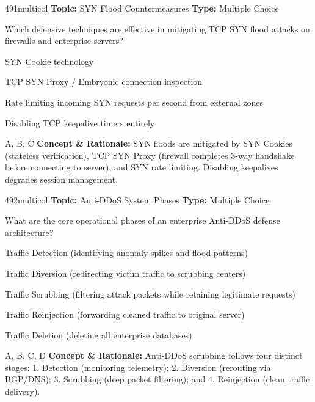 \begin{qcard}{491}{multicol}
\textcolor{darkslate!75}{\small\textbf{Topic:} SYN Flood Countermeasures \hfill \textbf{Type:} Multiple Choice}\vspace{0.4em}\par
Which defensive techniques are effective in mitigating TCP SYN flood attacks on firewalls and enterprise servers?
\begin{qoptions}
\item SYN Cookie technology
\item TCP SYN Proxy / Embryonic connection inspection
\item Rate limiting incoming SYN requests per second from external zones
\item Disabling TCP keepalive timers entirely
\end{qoptions}
\end{qcard}
\nopagebreak
\begin{explainbox}{A, B, C}
\textbf{Concept \& Rationale:} SYN floods are mitigated by SYN Cookies (stateless verification), TCP SYN Proxy (firewall completes 3-way handshake before connecting to server), and SYN rate limiting. Disabling keepalives degrades session management.
\end{explainbox}

\begin{qcard}{492}{multicol}
\textcolor{darkslate!75}{\small\textbf{Topic:} Anti-DDoS System Phases \hfill \textbf{Type:} Multiple Choice}\vspace{0.4em}\par
What are the core operational phases of an enterprise Anti-DDoS defense architecture?
\begin{qoptions}
\item Traffic Detection (identifying anomaly spikes and flood patterns)
\item Traffic Diversion (redirecting victim traffic to scrubbing centers)
\item Traffic Scrubbing (filtering attack packets while retaining legitimate requests)
\item Traffic Reinjection (forwarding cleaned traffic to original server)
\item Traffic Deletion (deleting all enterprise databases)
\end{qoptions}
\end{qcard}
\nopagebreak
\begin{explainbox}{A, B, C, D}
\textbf{Concept \& Rationale:} Anti-DDoS scrubbing follows four distinct stages: 1. Detection (monitoring telemetry); 2. Diversion (rerouting via BGP/DNS); 3. Scrubbing (deep packet filtering); and 4. Reinjection (clean traffic delivery).
\end{explainbox}

